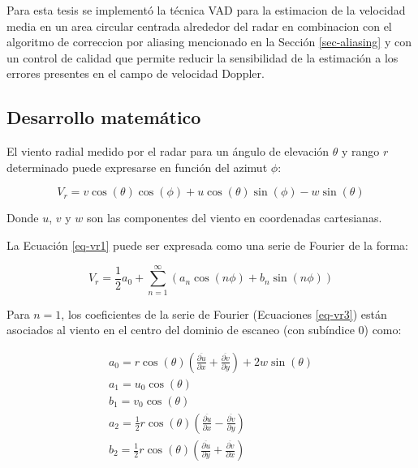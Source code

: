 \documentclass[12pt,spanish,oneside, a4paper]{book}
\begin{document}
Para esta tesis se implementó la técnica VAD para la estimacion de la
velocidad media en un area circular centrada alrededor del radar en
combinacion con el algoritmo de correccion por aliasing mencionado en la
Sección \ref{sec-aliasing} y con un control de calidad que permite
reducir la sensibilidad de la estimación a los errores presentes en el
campo de velocidad Doppler.

\subsection{Desarrollo matemático}\label{desarrollo-matematico}

El viento radial medido por el radar para un ángulo de elevación
\(\theta\) y rango \(r\) determinado puede expresarse en función del
azimut \(\phi\):

\begin{equation}
\label{eq-vr1}
V_r =  v \cos(\theta) \cos(\phi) + u \cos(\theta) \sin(\phi) - w \sin(\theta)
\end{equation}

Donde \(u\), \(v\) y \(w\) son las componentes del viento en coordenadas
cartesianas.

La Ecuación \ref{eq-vr1} puede ser expresada como una serie de Fourier
de la forma:

\begin{equation}
\label{eq-vr2}
V_r =  \frac{1}{2}a_0 + \sum_{n = 1}^{\infty} (a_n \cos(n\phi) + b_n \sin(n \phi)) 
\end{equation}

Para \(n=1\), los coeficientes de la serie de Fourier (Ecuaciones
\ref{eq-vr3}) están asociados al viento en el centro del dominio de
escaneo (con subíndice 0) como:

\begin{equation} \label{eq-vr3}
\begin{aligned}
a_0 = r \cos(\theta)\left ( \frac{\overline{\partial u}}{\partial x} + \frac{\overline{\partial v}}{\partial y} \right) + 2 w \sin(\theta) \\
a_1 = u_0 \cos(\theta) \\
b_1 = v_0 \cos(\theta) \\
a_2 = \frac{1}{2} r \cos(\theta)\left ( \frac{\overline{\partial u}}{\partial x} - \frac{\overline{\partial v}}{\partial y} \right) \\
b_2 = \frac{1}{2} r \cos(\theta)\left ( \frac{\overline{\partial u}}{\partial y} + \frac{\overline{\partial v}}{\partial x} \right)
\end{aligned}
\end{equation}
\end{document}
